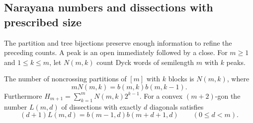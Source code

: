\subsection{Narayana numbers and dissections with prescribed size}
The partition and tree bijections preserve enough information to refine
the preceding counts. A peak is an open immediately followed by a close.
For $m\ge1$ and $1\le k\le m$, let $N(m,k)$ count Dyck words of
semilength $m$ with $k$ peaks.
\begin{theorem}\label{result13}
The number of noncrossing partitions of $[m]$ with $k$ blocks is $N(m,k)$,
where
\[
 mN(m,k)=b(m,k)b(m,k-1).
\]
Furthermore $H_{m+1}=\sum_{k=1}^{m}N(m,k)2^{k-1}$. For a convex
$(m+2)$-gon the number $L(m,d)$ of dissections with exactly $d$ diagonals
satisfies
\[
 (d+1)L(m,d)=b(m-1,d)b(m+d+1,d)\qquad(0\le d<m).
\]
\end{theorem}
